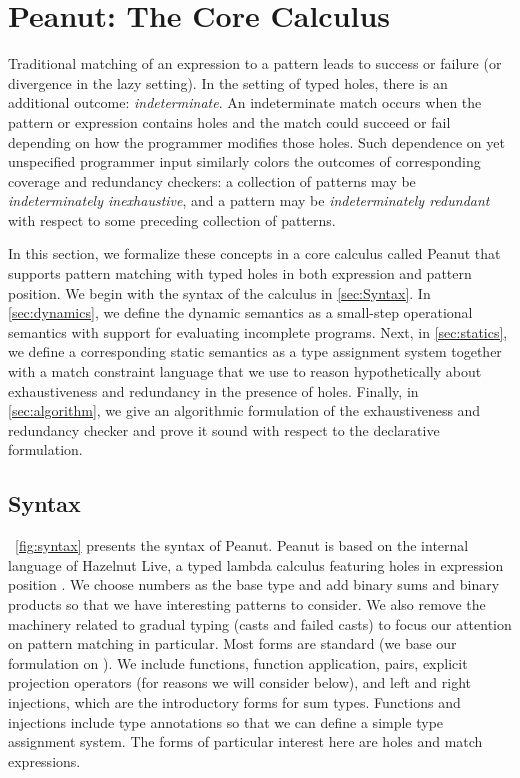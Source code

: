 \section{Peanut: The Core Calculus}
Traditional matching of an expression to a pattern leads to success or failure (or divergence in the lazy setting). In the setting of typed holes, there is an additional outcome: \emph{indeterminate}.
An indeterminate match occurs when the pattern or expression contains holes and the match could succeed or fail depending on how the programmer modifies those holes. Such dependence on yet unspecified programmer input similarly colors the outcomes of corresponding coverage and redundancy checkers: a collection of patterns may be \emph{indeterminately inexhaustive}, and a pattern may be \emph{indeterminately redundant} with respect to some preceding collection of patterns. 

In this section, we formalize these concepts in a core calculus called Peanut that supports pattern matching with typed holes in both expression and pattern position. 
We begin with the syntax of the calculus in \autoref{sec:Syntax}.
In \autoref{sec:dynamics}, we define the dynamic semantics as a small-step operational semantics with support for evaluating incomplete programs.
Next, in \autoref{sec:statics}, we define a corresponding static semantics as a type assignment system together with a match constraint language that we use to reason hypothetically about exhaustiveness and redundancy in the presence of
holes.
Finally, in \autoref{sec:algorithm}, we give an algorithmic formulation of the exhaustiveness and redundancy checker and prove it sound with respect to the declarative formulation.




\subsection{Syntax}
\label{sec:Syntax}
\figurename~\ref{fig:syntax} presents the syntax of Peanut.
Peanut is based on the internal language of Hazelnut Live, a typed lambda calculus featuring holes in expression position \cite{DBLP:journals/pacmpl/OmarVCH19}.
We choose numbers as the base type and add binary sums and binary products so that we have interesting
patterns to consider. We also remove the machinery related to gradual typing (casts and failed casts) to focus our attention on pattern matching in particular. Most forms are standard (we base our formulation on \cite{Harper2012}). We include functions, function application, pairs, explicit projection operators (for reasons we will consider below), and left and right injections, which are the introductory forms for sum types. Functions and injections include type annotations so that we can define a simple type assignment system. The forms of particular interest here are holes and match expressions.

